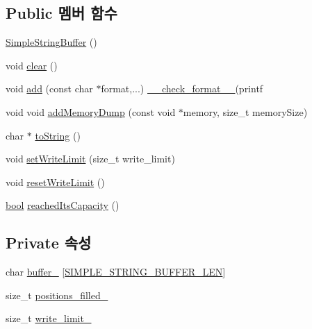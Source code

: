 \subsection*{Public 멤버 함수}
\begin{DoxyCompactItemize}
\item 
\hyperlink{struct_simple_string_buffer_ab6b9422a3af6864382d2417cb5efa50c}{Simple\+String\+Buffer} ()
\item 
void \hyperlink{struct_simple_string_buffer_ac8bb3912a3ce86b15842e79d0b421204}{clear} ()
\item 
void \hyperlink{struct_simple_string_buffer_ae2aa8147b398c989b73608c779bc7611}{add} (const char $\ast$format,...) \hyperlink{_cpp_u_test_config_8h_a39d884470f166f574271eb26af5b3e5a}{\+\_\+\+\_\+check\+\_\+format\+\_\+\+\_\+}(printf
\item 
void void \hyperlink{struct_simple_string_buffer_a2e93e33f23d85779303a1c58a7eca212}{add\+Memory\+Dump} (const void $\ast$memory, size\+\_\+t memory\+Size)
\item 
char $\ast$ \hyperlink{struct_simple_string_buffer_ac4969471df03a7a438bd99bfe61a0d5e}{to\+String} ()
\item 
void \hyperlink{struct_simple_string_buffer_abd59b77081323992830e4a3b9db501e6}{set\+Write\+Limit} (size\+\_\+t write\+\_\+limit)
\item 
void \hyperlink{struct_simple_string_buffer_a87467672236b76114024397b6d45a65c}{reset\+Write\+Limit} ()
\item 
\hyperlink{avb__gptp_8h_af6a258d8f3ee5206d682d799316314b1}{bool} \hyperlink{struct_simple_string_buffer_a31b75ce17bbbd17e22886da56b3b7cf8}{reached\+Its\+Capacity} ()
\end{DoxyCompactItemize}
\subsection*{Private 속성}
\begin{DoxyCompactItemize}
\item 
char \hyperlink{struct_simple_string_buffer_af38d458694e4e0863b2a2b77fd980706}{buffer\+\_\+} \mbox{[}\hyperlink{struct_simple_string_buffer_a4efaf4e07364d6302f598569aa7e55dca495824058d0344ce7789bfdfe6658843}{S\+I\+M\+P\+L\+E\+\_\+\+S\+T\+R\+I\+N\+G\+\_\+\+B\+U\+F\+F\+E\+R\+\_\+\+L\+EN}\mbox{]}
\item 
size\+\_\+t \hyperlink{struct_simple_string_buffer_ad38da5740fb5613e7c7745641be11761}{positions\+\_\+filled\+\_\+}
\item 
size\+\_\+t \hyperlink{struct_simple_string_buffer_a90266a524d354421a6fd68337917d395}{write\+\_\+limit\+\_\+}
\end{DoxyCompactItemize}



